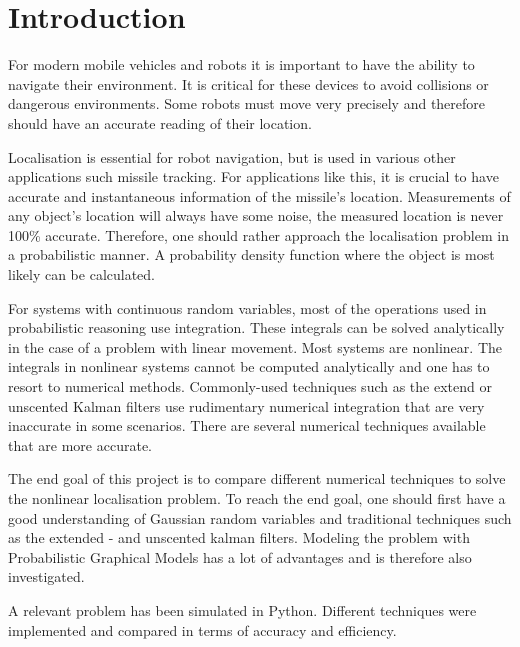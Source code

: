 \documentclass{article}
\begin{document}
\tableofcontents
\section{Introduction}
For modern mobile vehicles and robots it is important to have the ability to navigate their environment. It is critical for these devices to avoid collisions or dangerous environments. Some robots must move very precisely and therefore should have an accurate reading of their location.

Localisation is essential for robot navigation, but is used in various other applications such missile tracking. For applications like this, it is crucial to have accurate and instantaneous information of the missile's location. Measurements of any object's location will always have some noise,  the measured location is never 100\% accurate. Therefore, one should rather approach the localisation problem in a probabilistic manner. A probability density function where the object is most likely can be calculated.

For systems with continuous random variables, most of the operations used in probabilistic reasoning use integration. These integrals can be solved analytically in the case of a problem with linear movement. Most systems are nonlinear. The integrals in nonlinear systems cannot be computed analytically and one has to resort to numerical methods. Commonly-used techniques such as the extend or unscented Kalman filters use rudimentary numerical integration that are very inaccurate in some scenarios. There are several numerical techniques available that are more accurate.

The end goal of this project is to compare different numerical techniques to solve the nonlinear localisation problem. To reach the end goal, one should first have a good understanding of Gaussian random variables and traditional techniques such as the extended - and unscented kalman filters. Modeling the problem with Probabilistic Graphical Models has a lot of advantages and is therefore also investigated. 

A relevant problem has been simulated in Python. Different techniques were implemented and compared in terms of accuracy and efficiency.
\end{document}

